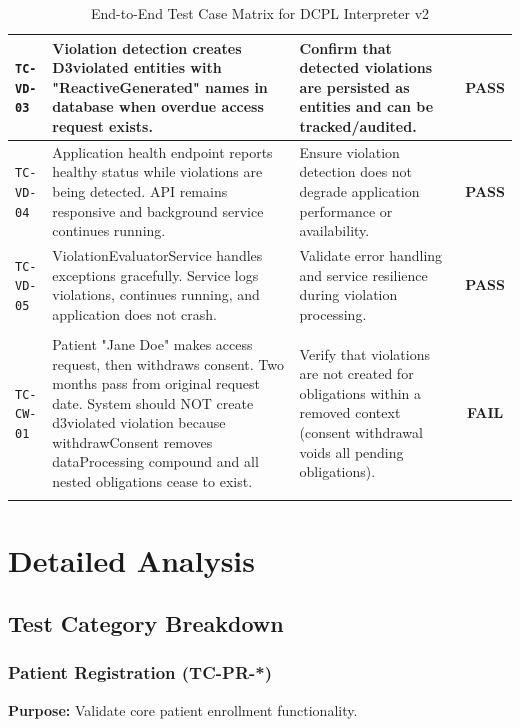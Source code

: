\documentclass[11pt,a4paper]{article}
\begin{document}
\begin{longtable}{|>{\raggedright\arraybackslash}p{2cm}|>{\raggedright\arraybackslash}p{5cm}|>{\raggedright\arraybackslash}p{3cm}|c|}
\texttt{TC-VD-03} & 
Violation detection creates D3violated entities with "ReactiveGenerated" names in database when overdue access request exists. & 
Confirm that detected violations are persisted as entities and can be tracked/audited. & 
\cellcolor{green!20}\textbf{PASS} \\
\hline

\texttt{TC-VD-04} & 
Application health endpoint reports healthy status while violations are being detected. API remains responsive and background service continues running. & 
Ensure violation detection does not degrade application performance or availability. & 
\cellcolor{green!20}\textbf{PASS} \\
\hline

\texttt{TC-VD-05} & 
ViolationEvaluatorService handles exceptions gracefully. Service logs violations, continues running, and application does not crash. & 
Validate error handling and service resilience during violation processing. & 
\cellcolor{green!20}\textbf{PASS} \\
\hline

\multicolumn{4}{|l|}{\cellcolor{blue!10}\textbf{Feature: Consent Withdrawal Impact on Violations}} \\
\hline

\texttt{TC-CW-01} & 
Patient "Jane Doe" makes access request, then withdraws consent. Two months pass from original request date. System should NOT create d3violated violation because withdrawConsent removes dataProcessing compound and all nested obligations cease to exist. & 
Verify that violations are not created for obligations within a removed context (consent withdrawal voids all pending obligations). & 
\cellcolor{red!20}\textbf{FAIL} \\
\hline

\caption{End-to-End Test Case Matrix for DCPL Interpreter v2}
\label{tab:test-matrix}
\end{longtable}

\section{Detailed Analysis}

\subsection{Test Category Breakdown}

\subsubsection{Patient Registration (TC-PR-*)}
\textbf{Purpose:} Validate core patient enrollment functionality.
\end{document}
